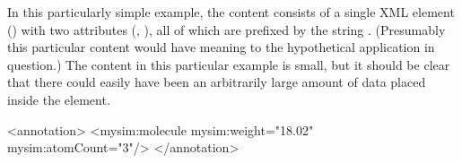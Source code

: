 In this particularly simple example, the content consists of a single
XML element () with two attributes
(, ), all of which are prefixed by
the string .  (Presumably this particular content
would have meaning to the hypothetical application in question.)
The content in this particular example is small, but it should be
clear that there could easily have been an arbitrarily large
amount of data placed inside the  element.


\begin{blockRelChange}
\begin{example}
<annotation>
    <mysim:molecule mysim:weight="18.02" mysim:atomCount="3"/>
</annotation>
\end{example}
\end{blockRelChange}

